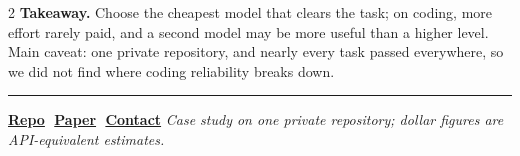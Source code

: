 \documentclass[a4paper,9pt]{extarticle}
\begin{document}
\begin{multicols}{2}
\smallskip\noindent\textbf{Takeaway.} Choose the cheapest model that clears the
task; on coding, more effort rarely paid, and a second model may be more useful than a
higher level. Main caveat: one private repository, and nearly every task
passed everywhere, so we did not find where coding reliability breaks down.

\end{multicols}

\vfill
\noindent\textcolor{accent!40}{\rule{\linewidth}{0.6pt}}

\vspace{0.15em}
\noindent\footnotesize%
\href{https://github.com/pleyva2004/subagent-routing-bench}{\textbf{Repo}}\,\textbar{}\,%
\href{https://pleyva2004.github.io/subagent-routing-bench/paper.pdf}{\textbf{Paper}}\,\textbar{}\,%
\href{mailto:pleyva2004@gmail.com}{\textbf{Contact}}\quad
\emph{Case study on one private repository; dollar figures are API-equivalent estimates.}
\normalsize
\end{document}
